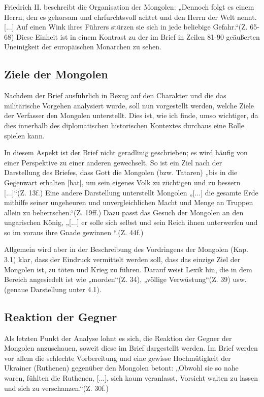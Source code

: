 \documentclass[12pt,headsepline,a4paper]{scrartcl}
\begin{document}
Friedrich II. beschreibt die Organisation der Mongolen:
„Dennoch folgt es einem Herrn, den es gehorsam und ehrfurchtsvoll achtet und den
Herrn der Welt nennt. [...] Auf einen Wink ihres Führers stürzen sie sich in jede
beliebige Gefahr.“(Z. 65-68) Diese Einheit ist in einem Kontrast zu der im Brief in
Zeilen 81-90 geäußerten Uneinigkeit der europäischen Monarchen zu sehen.\autocite[80]{bezzola1974}

\subsection{Ziele der Mongolen}
Nachdem der Brief ausführlich in Bezug auf den Charakter und die das militärische
Vorgehen analysiert wurde, soll nun vorgestellt werden, welche Ziele der Verfasser den
Mongolen unterstellt. Dies ist, wie ich finde, umso wichtiger, da dies innerhalb des
diplomatischen historischen Kontextes durchaus eine Rolle spielen kann.

In diesem Aspekt ist der Brief nicht geradlinig geschrieben; es wird häufig von einer
Perspektive zu einer anderen gewechselt. So ist ein Ziel nach der Darstellung des Briefes, dass Gott die Mongolen (bzw.
Tataren) „bis in die Gegenwart erhalten [hat], um sein eigenes Volk zu züchtigen und zu
bessern [...]“(Z. 13f.) Eine andere Darstellung unterstellt Mongolen „[...] die
gesamte Erde mithilfe seiner ungeheuren und unvergleichlichen Macht und Menge an
Truppen allein zu beherrschen.“(Z. 19ff.) Dazu passt das Gesuch der Mongolen an den
ungarischen König, „[...] er solle sich selbst und sein Reich ihnen unterwerfen und so
im voraus ihre Gnade gewinnen “.(Z. 44f.)

Allgemein wird aber in der Beschreibung des Vordringens der Mongolen (Kap. 3.1)
klar, dass der Eindruck vermittelt werden soll, dass das einzige Ziel der Mongolen ist,
zu töten und Krieg zu führen. Darauf weist Lexik hin, die in dem Bereich
angesiedelt ist wie „morden“(Z. 34), „völlige Verwüstung“(Z. 39) usw. (genaue
Darstellung unter 4.1).

\subsection{Reaktion der Gegner}
Als letzten Punkt der Analyse lohnt es sich, die Reaktion der Gegner der Mongolen
anzuschauen, soweit diese im Brief dargestellt werden. Im Brief werden vor allem die
schlechte Vorbereitung und eine gewisse Hochmütigkeit der Ukrainer (Ruthenen)
gegenüber den Mongolen betont: „Obwohl sie so nahe waren, fühlten die Ruthenen,
[...], sich kaum veranlasst, Vorsicht walten zu lassen und sich zu verschanzen.“(Z. 30f.)
\end{document}
